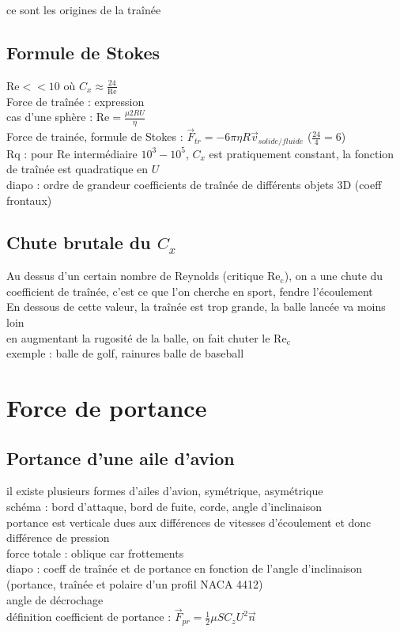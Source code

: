 ce sont les origines de la traînée \\

\subsection{Formule de Stokes}
$\mathrm{Re} << 10$ où $C_x \approx \frac{24}{\mathrm{Re}}$ \\
Force de traînée : expression \\
cas d'une sphère : $\mathrm{Re}=\frac{\mu 2 R U}{\eta}$ \\
Force de trainée, formule de Stokes : $\vec{F}_{tr}=-6\pi \eta R \vec{v}_{solide/fluide}$  ($\frac{24}{4}=6$)\\
Rq : pour $\mathrm{Re}$ intermédiaire $10^3 - 10^5 $, $C_x$ est pratiquement constant, la fonction de traînée est quadratique en $U$ \\
diapo : ordre de grandeur coefficients de traînée de différents objets 3D (coeff frontaux) \\

\subsection{Chute brutale du $C_x$ }
Au dessus d'un certain nombre de Reynolds (critique $\mathrm{Re_c}$), on a une chute du coefficient de traînée, c'est ce que l'on cherche en sport, fendre l'écoulement \\
En dessous de cette valeur, la traînée est trop grande, la balle lancée va moins loin \\
en augmentant la rugosité de la balle, on fait chuter le $\mathrm{Re_c}$ \\
exemple : balle de golf, rainures balle de baseball \\


\section{Force de portance}
\subsection{Portance d'une aile d'avion}
il existe plusieurs formes d'ailes d'avion, symétrique, asymétrique \\
schéma : bord d'attaque, bord de fuite, corde, angle d'inclinaison \\
portance est verticale dues aux différences de vitesses d'écoulement et donc différence de pression \\
force totale : oblique car frottements \\
diapo : coeff de traînée et de portance en fonction de l'angle d'inclinaison (portance, traînée et polaire d'un profil NACA 4412) \\
angle de décrochage \\
définition coefficient de portance : $\vec{F}_{pr}=\frac{1}{2} \mu S C_z U^2 \vec{n}$ \\

